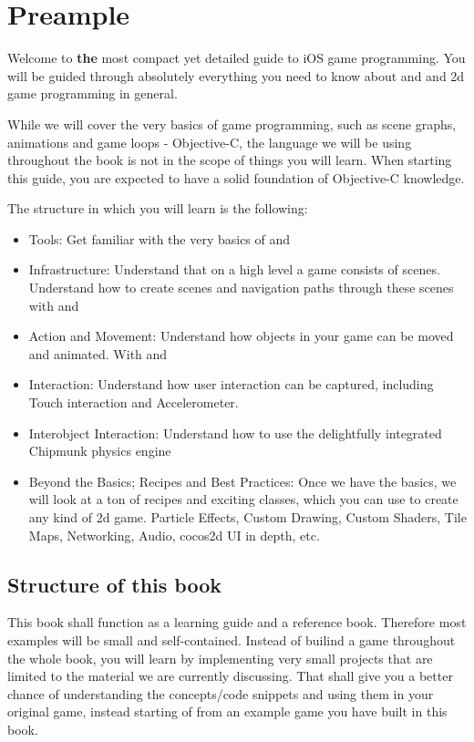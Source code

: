 \chapter{Preample}
Welcome to \textbf{the} most compact yet detailed guide to iOS game programming.
You will be guided through absolutely everything you need to know about
\cocos{} and \spriteb{} and 2d game programming in general.

While we will cover the very basics of game programming, such as scene graphs,
animations and game loops - Objective-C, the language we will be using
throughout the book is not in the scope of things you will learn. When starting
this guide, you are expected to have a solid foundation of Objective-C
knowledge.

The structure in which you will learn is the following:
\begin{itemize}
  \item Tools: Get familiar with the very basics of \cocos{} and \spriteb{}
  \item Infrastructure: Understand that on a high level a game consists of
  scenes. Understand how to create scenes and navigation paths through these
  scenes with \cocos{} and \spriteb{}
  \item Action and Movement: Understand how objects in your game can be moved
  and animated. With \cocos{} and \spriteb{}
  \item Interaction: Understand how user interaction can be captured, including
  Touch interaction and Accelerometer.
  \item Interobject Interaction: Understand how to use the delightfully
  integrated Chipmunk physics engine
  \item Beyond the Basics; Recipes and Best Practices:  Once we have the basics,
  we will look at a ton of recipes and exciting \cocos{} classes, which you can
  use to create any kind of 2d game. Particle Effects, Custom Drawing, Custom
  Shaders, Tile Maps, Networking, Audio, cocos2d UI in depth, etc.
\end{itemize}

\section{Structure of this book}
This book shall function as a learning guide and a reference book. Therefore
most examples will be small and self-contained. Instead of builind a game
throughout the whole book, you will learn by implementing very small projects
that are limited to the material we are currently discussing. 
That shall give you a better chance of understanding the concepts/code
snippets and using them in your original game, instead starting of from an
example game you have built in this book.

